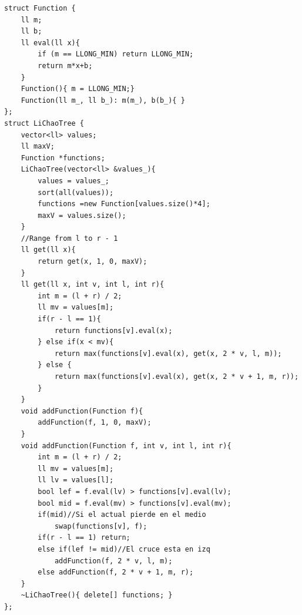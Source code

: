 \documentclass[12 pts,spanish,mexico]{article}
\numberwithin{equation}{section}
\begin{document}
\begin{multicols}{2}
\begin{verbatim}
struct Function {
    ll m;
    ll b;
    ll eval(ll x){
        if (m == LLONG_MIN) return LLONG_MIN;
        return m*x+b;
    }
    Function(){ m = LLONG_MIN;}
    Function(ll m_, ll b_): m(m_), b(b_){ }
};
struct LiChaoTree {
    vector<ll> values;
    ll maxV;
    Function *functions;
    LiChaoTree(vector<ll> &values_){
        values = values_;
        sort(all(values));
        functions =new Function[values.size()*4];
        maxV = values.size();
    }
    //Range from l to r - 1
    ll get(ll x){
        return get(x, 1, 0, maxV);
    }
    ll get(ll x, int v, int l, int r){
        int m = (l + r) / 2;
        ll mv = values[m];
        if(r - l == 1){
            return functions[v].eval(x);
        } else if(x < mv){
            return max(functions[v].eval(x), get(x, 2 * v, l, m));
        } else {
            return max(functions[v].eval(x), get(x, 2 * v + 1, m, r));
        }
    }
    void addFunction(Function f){
        addFunction(f, 1, 0, maxV);
    }
    void addFunction(Function f, int v, int l, int r){
        int m = (l + r) / 2;
        ll mv = values[m];
        ll lv = values[l];
        bool lef = f.eval(lv) > functions[v].eval(lv);
        bool mid = f.eval(mv) > functions[v].eval(mv);
        if(mid)//Si el actual pierde en el medio
            swap(functions[v], f);
        if(r - l == 1) return;
        else if(lef != mid)//El cruce esta en izq
            addFunction(f, 2 * v, l, m);
        else addFunction(f, 2 * v + 1, m, r);
    }
    ~LiChaoTree(){ delete[] functions; }
};
\end{verbatim}

\end{multicols}

\end{document}
